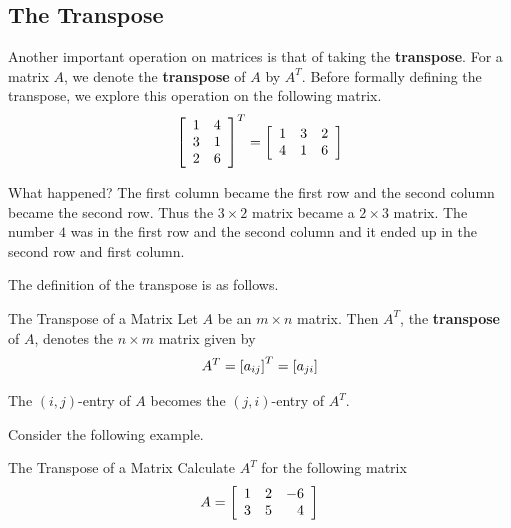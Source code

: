 \subsection{The Transpose}

Another important operation on matrices is that of taking the \textbf{transpose}. For a matrix $A$, we denote the
\textbf{transpose} of $A$ by $A^T$. Before formally defining the transpose, we explore this
operation on the following matrix.
\begin{equation*}
\left[
\begin{array}{cc}
1 & 4 \\
3 & 1 \\
2 & 6
\end{array}
\right] ^{T}=\allowbreak \left[
\begin{array}{ccc}
1 & 3 & 2 \\
4 & 1 & 6
\end{array}
\right]
\end{equation*}

What happened? The first column became the first row and the second column
became the second row. Thus the $3\times 2$ matrix became a $2\times 3$
matrix. The number $4$ was in the first row and the second column and it
ended up in the second row and first column. 

The definition of the transpose is as follows.

\begin{definition}{The Transpose of a Matrix}\label{def:matrixtranspose}
Let $A$ be an $m\times n$ matrix. Then $A^{T}$, the \textbf{transpose}  of $A$,  denotes the $n\times m$
matrix given by 
\begin{equation*}
A^{T} = \left[ a _{ij}\right] ^{T}= \left[ a_{ji} \right]
\end{equation*}
\end{definition}

The $\left( i, j  \right)$-entry of $A$ becomes the 
$\left( j,i \right)$-entry of $A^T$. 

Consider the following example.

\begin{example}{The Transpose of a Matrix}\label{exa:transposematrix}
Calculate $A^T$ for the following matrix
\begin{equation*}
A = \left[
\begin{array}{rrr}
1 & 2 & -6 \\
3 & 5 & 4
\end{array}
\right]
\end{equation*}
\end{example}

